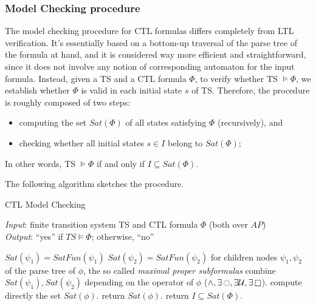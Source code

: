 \documentclass{article}
\begin{document}
\subsubsection*{Model Checking procedure}
The model checking procedure for CTL formulas differs completely from LTL verification. 
It's essentially based on a bottom-up traversal of the parse tree of the formula at hand, 
and it is considered way more efficient and straightforward, since it does not involve any notion of 
corresponding automaton for the input formula. Instead, given a TS and a CTL formula $\Phi$, to verify 
whether TS $\vDash \Phi$, we establish whether $\Phi$ is valid in each initial state $s$ of TS. 
Therefore, the procedure is roughly composed of two steps: 
\begin{itemize}
    \item computing the set $Sat(\Phi)$ of all states satisfying $\Phi$ (recursively), and
    \item checking whether all initial states $s \in I$ belong to $Sat(\Phi)$; 
\end{itemize}
In other words, TS $\vDash \Phi$ if and only if $I \subseteq Sat(\Phi)$.


The following algorithm sketches the procedure. 
\label{subsec-CTLmca}
\begin{algorithm}[H]
    \caption{CTL Model Checking}
    \label{alg:CTLmc}
    \hspace*{\algorithmicindent} \emph{Input}: finite transition system TS and CTL formula $\Phi$ (both over $AP$) \\
    \hspace*{\algorithmicindent} \emph{Output}: ``yes'' if $TS \vDash \Phi$; otherwise, ``no''
    \begin{algorithmic}[1]
            \State $Sat(\psi_1) = SatFun(\psi_1)$ 
            \State $Sat(\psi_2) = SatFun(\psi_2)$ 
            for children nodes $\psi_1, \psi_2$ of the parse tree of $\phi$, the so called \emph{maximal proper subformulas}
            \State combine $Sat(\psi_1), Sat(\psi_2)$ depending on the operator of $\phi$ ($\land, \exists\mathop{\ocircle}, \exists\mathbin{\mathcal{U}}, \exists\mathop{\square}$).
        \Else
            \State compute directly the set $Sat(\phi)$.
        \EndIf
        \State return $Sat(\phi)$.
    \EndFunction
    \State return $I \subseteq Sat(\Phi)$.
    \end{algorithmic}
\end{algorithm}
\end{document}
